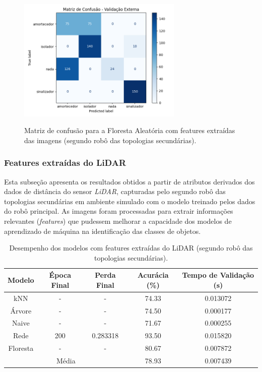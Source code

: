 \begin{figure}[H]
\centering
\caption{Matriz de confusão para a Floresta Aleatória com features extraídas das imagens (segundo robô das topologias secundárias).}
\includegraphics[width=0.7\textwidth]{figuras/Resultados/multi_segundo_Teste3_rf.png}
\label{fig:mc_featimg_rf_robo2_t3}
\fonte{}
\end{figure}

\subsubsection{Features extraídas do LiDAR}

Esta subseção apresenta os resultados obtidos a partir de atributos derivados dos dados de distância do sensor \textit{LiDAR}, capturadas pelo segundo robô das topologias secundárias em ambiente simulado com o modelo treinado pelos dados do robô principal. As imagens foram processadas para extrair informações relevantes (\textit{features}) que pudessem melhorar a capacidade dos modelos de aprendizado de máquina na identificação das classes de objetos.

\begin{table}[H]
\caption{Desempenho dos modelos com features extraídas do LiDAR (segundo robô das topologias secundárias).}
\centering
\begin{tabular}{ccccc}
\hline
\textbf{Modelo} & \textbf{Época Final} & \textbf{Perda Final} & \textbf{Acurácia (\%)} & \textbf{Tempo de Validação (s)}  \\
\hline
kNN      & - & - & 74.33 & 0.013072 \\
Árvore   & - & - & 74.50 & 0.000177 \\
Naive    & - & - & 71.67 & 0.000255 \\
Rede     & 200 & 0.283318 & 93.50 & 0.015820 \\
Floresta & - & - & 80.67 & 0.007872 \\
\hline
\multicolumn{3}{c}{Média} & 78.93 & 0.007439 \\
\hline
\end{tabular}
\fonte{}
\label{tab:modelos_featlidar_robo2}
\end{table}

